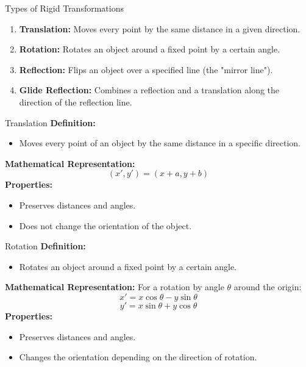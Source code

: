 \documentclass{beamer}
\begin{document}
    \begin{frame}{Types of Rigid Transformations}
        \begin{enumerate}
            \item \textbf{Translation:} Moves every point by the same distance in a given direction.
            \item \textbf{Rotation:} Rotates an object around a fixed point by a certain angle.
            \item \textbf{Reflection:} Flips an object over a specified line (the "mirror line").
            \item \textbf{Glide Reflection:} Combines a reflection and a translation along the direction of the reflection line.
        \end{enumerate}
    \end{frame}
    
    \begin{frame}{Translation}
        \textbf{Definition:}
        \begin{itemize}
            \item Moves every point of an object by the same distance in a specific direction.
        \end{itemize}
        \textbf{Mathematical Representation:}
        \[
        (x', y') = (x + a, y + b)
        \]
        \textbf{Properties:}
        \begin{itemize}
            \item Preserves distances and angles.
            \item Does not change the orientation of the object.
        \end{itemize}
    \end{frame}
    
    \begin{frame}{Rotation}
        \textbf{Definition:}
        \begin{itemize}
            \item Rotates an object around a fixed point by a certain angle.
        \end{itemize}
        \textbf{Mathematical Representation:}
        For a rotation by angle \(\theta\) around the origin:
        \[
        x' = x \cos\theta - y \sin\theta
        \]
        \[
        y' = x \sin\theta + y \cos\theta
        \]
        \textbf{Properties:}
        \begin{itemize}
            \item Preserves distances and angles.
            \item Changes the orientation depending on the direction of rotation.
        \end{itemize}
    \end{frame}
    
\end{document}
